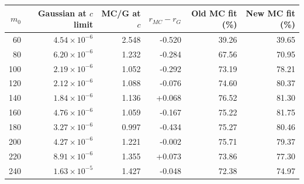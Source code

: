 \begin{tabular}{rrrrrr}
\toprule
$m_0$ & Gaussian at $c$ limit & MC/G at $c$ & $r_{MC}-r_G$ & Old MC fit (\%) & New MC fit (\%) \\
\midrule
60 & $4.54\times10^{-6}$ & 2.548 & -0.520 & 39.26 & 39.65 \\
80 & $6.20\times10^{-6}$ & 1.232 & -0.284 & 67.56 & 70.95 \\
100 & $2.19\times10^{-6}$ & 1.052 & -0.292 & 73.19 & 78.21 \\
120 & $2.12\times10^{-6}$ & 1.088 & -0.076 & 74.60 & 80.37 \\
140 & $1.84\times10^{-6}$ & 1.136 & +0.068 & 76.52 & 81.30 \\
160 & $4.76\times10^{-6}$ & 1.059 & -0.167 & 75.22 & 81.75 \\
180 & $3.27\times10^{-6}$ & 0.997 & -0.434 & 75.27 & 80.46 \\
200 & $4.27\times10^{-6}$ & 1.221 & -0.002 & 75.71 & 79.37 \\
220 & $8.91\times10^{-6}$ & 1.355 & +0.073 & 73.86 & 77.30 \\
240 & $1.63\times10^{-5}$ & 1.427 & -0.048 & 72.38 & 74.97 \\
\bottomrule
\end{tabular}
